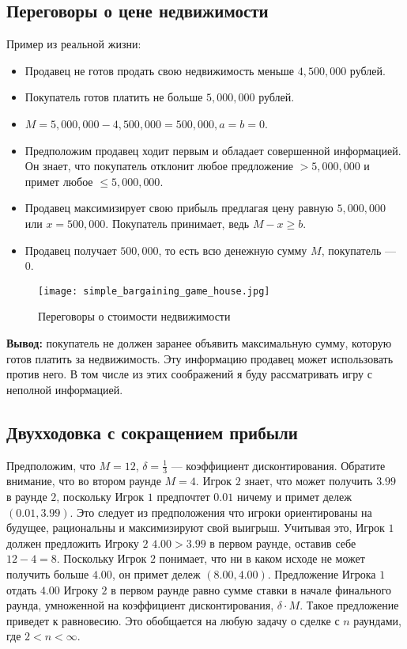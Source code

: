\subsection{Переговоры о цене недвижимости}
Пример из реальной жизни:

\begin{itemize}

    \item Продавец не готов продать свою недвижимость меньше $4{,}500{,}000$ рублей.
    
    \item Покупатель готов платить не больше $5{,}000{,}000$ рублей.
        
    \item $M = 5{,}000{,}000-4{,}500{,}000 = 500{,}000, a = b = 0$.
    
    \item Предположим продавец ходит первым и обладает совершенной информацией. Он знает, что покупатель отклонит любое предложение $> 5{,}000{,}000$ и примет любое $\leq 5{,}000{,}000$.
    
    \item Продавец максимизирует свою прибыль предлагая цену равную $5{,}000{,}000$ или $x = 500{,}000$. Покупатель принимает, ведь $M - x \geq b$.
    
    \item Продавец получает $500{,}000$, то есть всю денежную сумму $M$, покупатель --- 0.
    
\end{itemize}

\begin{figure}[h]
  \centering
  \texttt{[image: simple\_bargaining\_game\_house.jpg]}
  \caption{Переговоры о стоимости недвижимости}
\end{figure}

\textbf{Вывод:} покупатель не должен заранее объявить максимальную сумму, которую готов платить за недвижимость. Эту информацию продавец может использовать против него. В том числе из этих соображений я буду рассматривать игру с неполной информацией.


\subsection{Двухходовка с сокращением прибыли}

Предположим, что $M=12$, $\delta=\frac{1}{3}$ — коэффициент дисконтирования. Обратите внимание, что во втором раунде $M=4$. Игрок $2$ знает, что может получить $3.99$ в раунде $2$, поскольку Игрок $1$ предпочтет $0.01$ ничему и примет дележ $(0.01, 3.99)$. Это следует из предположения что игроки ориентированы на будущее, рациональны и максимизируют свой выигрыш. Учитывая это, Игрок $1$ должен предложить Игроку $2$ $4.00 > 3.99$ в первом раунде, оставив себе $12 - 4 = 8$. Поскольку Игрок $2$ понимает, что ни в каком исходе не может получить больше $4.00$, он примет дележ $(8.00, 4.00)$. Предложение Игрока $1$ отдать $4.00$ Игроку $2$ в первом раунде равно сумме ставки в начале финального раунда, умноженной на коэффициент дисконтирования, $\delta \cdot M$. Такое предложение приведет к равновесию. Это обобщается на любую задачу о сделке с $n$ раундами, где $2 < n < \infty$.

